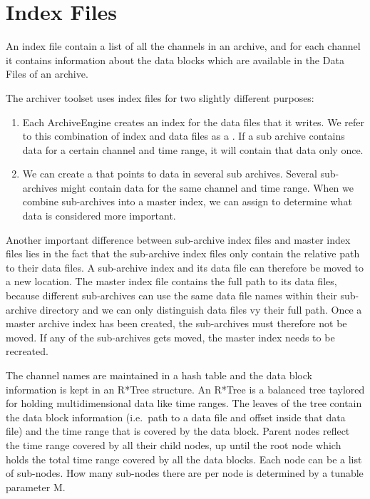 \section{Index Files}
An index file contain a list of all the channels in an archive, and
for each channel it contains information about the data blocks which
are available in the Data Files of an archive.

\noindent The archiver toolset uses index files for two slightly different
purposes:
\begin{enumerate}
\item Each ArchiveEngine creates an index for the data files
      that it writes.
      We refer to this combination of index and data files
      as a .
      If a sub archive contains data for a certain channel and time
      range, it will contain that data only once.
\item We can create a  that points to data
      in several sub archives.
      Several sub-archives might contain data for the same channel
      and time range. When we combine sub-archives into a master
      index, we can assign  to
      determine what data is considered more important.
\end{enumerate}

\noindent Another important difference between sub-archive index files
and master index files lies in the fact that the sub-archive index
files only contain the relative path to their data files.
A sub-archive index and its data file can therefore be moved to a new
location.
The master index file contains the full path to its data files,
because different sub-archives can use the same data file names within
their sub-archive directory and we can only distinguish data files vy
their full path.
Once a master archive index has been created, the sub-archives must
therefore not be moved. If any of the sub-archives gets moved, the
master index needs to be recreated.

The channel names are maintained in a hash table and the
data block information is kept in an R*Tree structure.
An R*Tree is a balanced tree taylored for holding
multidimensional data like time ranges.
The leaves of the tree contain the data block
information (i.e.\ path to a data file and offset inside that data
file) and the time range that is covered by the data block. Parent
nodes reflect the time range covered by all their child nodes, up
until the root node which holds the total time range covered by all
the data blocks. Each node can be a list of sub-nodes. How many
sub-nodes there are per node is determined by a tunable parameter M.

